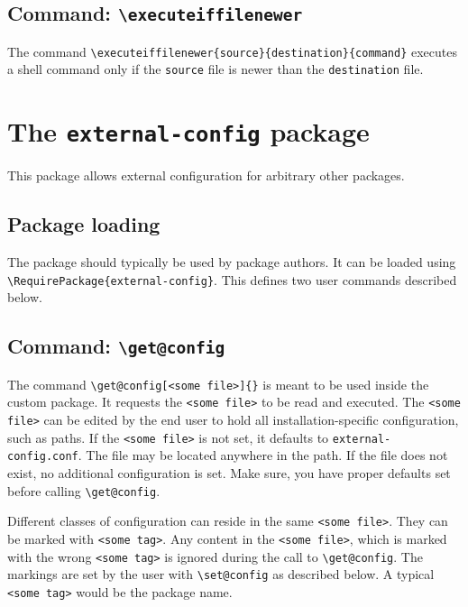 \documentclass{article}
\let\otextbackslash\textbackslash
\renewcommand\textbackslash{{\rmfamily\otextbackslash}}
\begin{document}
\subsection{Command: \texttt{\textbackslash executeiffilenewer}}
The command \texttt{\textbackslash executeiffilenewer\{source\}\{destination\}\{command\}} executes a shell command only if the \texttt{source} file is newer than the \texttt{destination} file.



\section{The \texttt{external-config} package}
This package allows external configuration for arbitrary other packages.

\subsection{Package loading}
The package should typically be used by package authors. It can be loaded using \texttt{\textbackslash RequirePackage\{external-config\}}. This defines two user commands described below.

\subsection{Command: \texttt{\textbackslash get@config}}
The command \texttt{\textbackslash get@config[<some file>]\{<some tag>\}} is meant to be used inside the custom package. It requests the \texttt{<some file>} to be read and executed. The \texttt{<some file>} can be edited by the end user to hold all installation-specific configuration, such as paths. If the \texttt{<some file>} is not set, it defaults to \texttt{external-config.conf}. The file may be located anywhere in the path. If the file does not exist, no additional configuration is set. Make sure, you have proper defaults set before calling \texttt{\textbackslash get@config}. 

Different classes of configuration can reside in the same \texttt{<some file>}. They can be marked with \texttt{<some tag>}. Any content in the \texttt{<some file>}, which is marked with the wrong \texttt{<some tag>} is ignored during the call to \texttt{\textbackslash get@config}. The markings are set by the user with \texttt{\textbackslash set@config} as described below. A typical \texttt{<some tag>} would be the package name.
\end{document}

